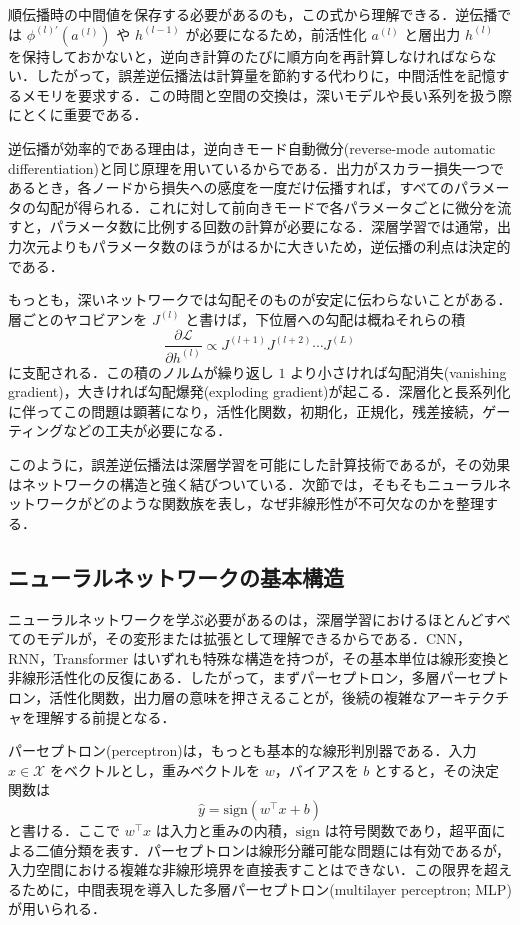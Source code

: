 順伝播時の中間値を保存する必要があるのも，この式から理解できる．逆伝播では $\phi^{(l)\prime}(a^{(l)})$ や $h^{(l-1)}$ が必要になるため，前活性化 $a^{(l)}$ と層出力 $h^{(l)}$ を保持しておかないと，逆向き計算のたびに順方向を再計算しなければならない．したがって，誤差逆伝播法は計算量を節約する代わりに，中間活性を記憶するメモリを要求する．この時間と空間の交換は，深いモデルや長い系列を扱う際にとくに重要である．

逆伝播が効率的である理由は，逆向きモード自動微分(reverse-mode automatic differentiation)と同じ原理を用いているからである．出力がスカラー損失一つであるとき，各ノードから損失への感度を一度だけ伝播すれば，すべてのパラメータの勾配が得られる．これに対して前向きモードで各パラメータごとに微分を流すと，パラメータ数に比例する回数の計算が必要になる．深層学習では通常，出力次元よりもパラメータ数のほうがはるかに大きいため，逆伝播の利点は決定的である．

もっとも，深いネットワークでは勾配そのものが安定に伝わらないことがある．層ごとのヤコビアンを $J^{(l)}$ と書けば，下位層への勾配は概ねそれらの積
\begin{equation}
\frac{\partial \mathcal L}{\partial h^{(l)}}
\propto
J^{(l+1)}J^{(l+2)}\cdots J^{(L)}
\end{equation}
に支配される．この積のノルムが繰り返し $1$ より小さければ勾配消失(vanishing gradient)，大きければ勾配爆発(exploding gradient)が起こる．深層化と長系列化に伴ってこの問題は顕著になり，活性化関数，初期化，正規化，残差接続，ゲーティングなどの工夫が必要になる．

このように，誤差逆伝播法は深層学習を可能にした計算技術であるが，その効果はネットワークの構造と強く結びついている．次節では，そもそもニューラルネットワークがどのような関数族を表し，なぜ非線形性が不可欠なのかを整理する．

\subsection{ニューラルネットワークの基本構造}
ニューラルネットワークを学ぶ必要があるのは，深層学習におけるほとんどすべてのモデルが，その変形または拡張として理解できるからである．CNN，RNN，Transformer はいずれも特殊な構造を持つが，その基本単位は線形変換と非線形活性化の反復にある．したがって，まずパーセプトロン，多層パーセプトロン，活性化関数，出力層の意味を押さえることが，後続の複雑なアーキテクチャを理解する前提となる．

パーセプトロン(perceptron)は，もっとも基本的な線形判別器である．入力 $x\in\mathcal X$ をベクトルとし，重みベクトルを $w$，バイアスを $b$ とすると，その決定関数は
\begin{equation}
\hat y = \mathrm{sign}(w^\top x + b)
\end{equation}
と書ける．ここで $w^\top x$ は入力と重みの内積，$\mathrm{sign}$ は符号関数であり，超平面による二値分類を表す．パーセプトロンは線形分離可能な問題には有効であるが，入力空間における複雑な非線形境界を直接表すことはできない．この限界を超えるために，中間表現を導入した多層パーセプトロン(multilayer perceptron; MLP)が用いられる．

